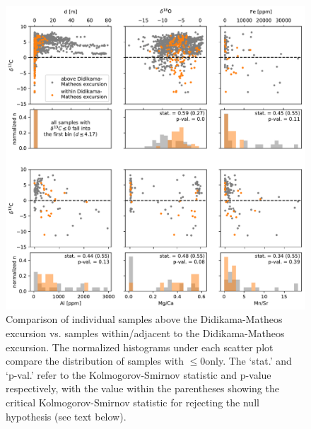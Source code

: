 \begin{figure}[h!]
\begin{center}
	\includegraphics[width=\textwidth]{figures/Tambien/siliciclastic-filtering-DidiMath-excursion.pdf}
	\caption[Comparison of individual samples above the Didikama-Matheos excursion vs. samples within/adjacent to the Didikama-Matheos excursion.]{Comparison of individual samples above the Didikama-Matheos excursion vs. samples within/adjacent to the Didikama-Matheos excursion. The normalized histograms under each scatter plot compare the distribution of samples with \dC$\leq$0\permil only. The `stat.' and `p-val.' refer to the Kolmogorov-Smirnov statistic and p-value respectively, with the value within the parentheses showing the critical Kolmogorov-Smirnov statistic for rejecting the null hypothesis (see text below).}
	\label{fig:siliciclastic-filtering-DidiMath-excursion}
\end{center}
\end{figure}

\clearpage

